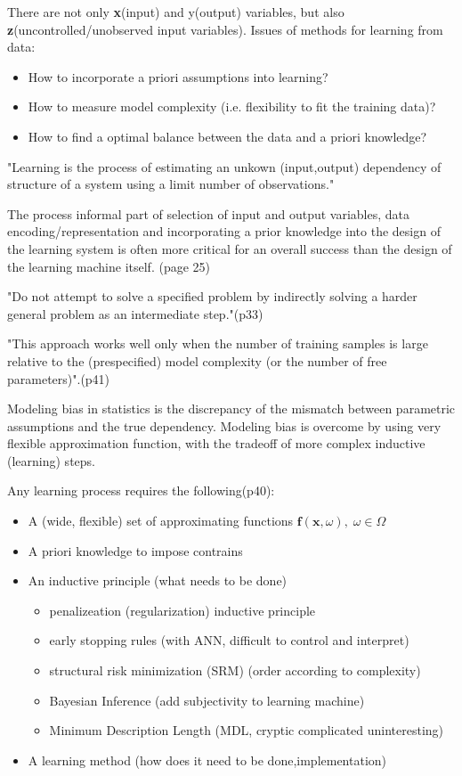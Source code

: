 There are not only \textbf{x}(input) and y(output) variables, but also \textbf{z}(uncontrolled/unobserved input variables).
Issues of methods for learning from data: 
\begin{itemize}
	\item How to incorporate a priori assumptions into learning? 
	\item How to measure model complexity (i.e. flexibility to fit the training data)?
	\item How to find a optimal balance between the data and a priori knowledge? 
\end{itemize}
\cite{cherkassky1998learning}

"Learning is the process of estimating an unkown (input,output) dependency of structure of a system using a limit number of observations."\cite{cherkassky1998learning}

The process informal part of selection of input and output variables, data encoding/representation and incorporating a prior knowledge into the design of the learning system is often more critical for an overall success than the design of the learning machine itself.\cite{cherkassky1998learning} (page 25)

"Do not attempt to solve a specified problem by indirectly solving a harder general problem as an intermediate step."\cite{cherkassky1998learning}(p33)

"This approach works well only when the number of training samples is large relative to the (prespecified) model complexity (or the number of free parameters)".\cite{cherkassky1998learning}(p41)

Modeling bias in statistics is the discrepancy of the mismatch between parametric assumptions and the true dependency.
Modeling bias is overcome by using very flexible approximation function, with the tradeoff of more complex inductive (learning) steps. 

Any learning process requires the following(p40): 
\begin{itemize}
	\item A (wide, flexible) set of approximating functions $\mathbf{f}(\mathbf{x},\omega),\; \omega \in \Omega$
	\item A priori knowledge to impose contrains
	\item An inductive principle (what needs to be done)
		\begin{itemize}
			\item penalizeation (regularization) inductive principle
			\item early stopping rules (with ANN, difficult to control and interpret)
			\item structural risk minimization (SRM) (order according to complexity)
			\item Bayesian Inference (add subjectivity to learning machine)
			\item Minimum Description Length (MDL, cryptic complicated uninteresting)
		\end{itemize}
	\item A learning method (how does it need to be done,implementation)
\end{itemize}
\cite{cherkassky1998learning}


